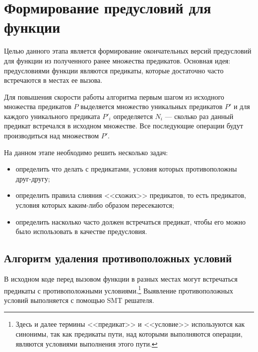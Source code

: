 \section{Формирование предусловий для функции}
\label{section:merging}
Целью данного этапа является формирование окончательных версий предусловий для функции из полученного ранее множества предикатов. Основная идея: предусловиями функции являются предикаты, которые достаточно часто встречаются в местах ее вызова. 

Для повышения скорости работы алгоритма первым шагом из исходного множества предикатов $P$ выделяется множество уникальных предикатов $P'$ и для каждого уникального предиката $P'_i$ определяется $N_i$ --- сколько раз данный предикат встречался в исходном множестве. Все последующие операции будут производиться над множеством $P'$.

На данном этапе необходимо решить несколько задач:
\begin{itemize}
\item определить что делать с предикатами, условия которых противоположны друг-другу;
\item определить правила слияния <<схожих>> предикатов, то есть предикатов, условия которых каким-либо образом пересекаются;
\item определить насколько часто должен встречаться предикат, чтобы его можно было использовать в качестве предусловия.
\end{itemize}

\subsection{Алгоритм удаления противоположных условий}
В исходном коде перед вызовом функции в разных местах могут встречаться предикаты с противоположными условиями.\footnote{Здесь и далее термины <<предикат>> и <<условие>> используются как синонимы, так как предикаты пути, над которыми выполняются операции, являются условиями выполнения этого пути.} Выявление противоположных условий выполняется с помощью SMT решателя. 

